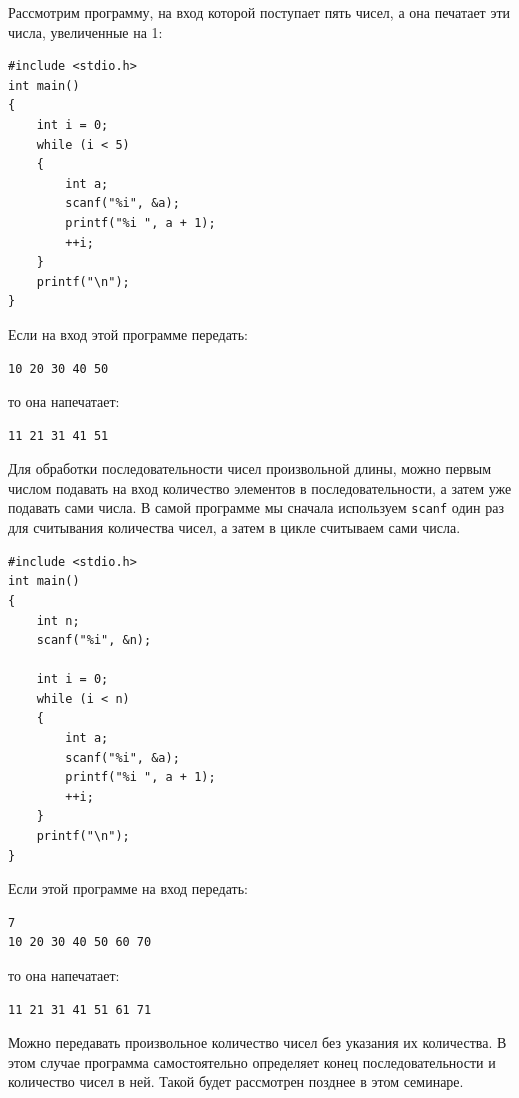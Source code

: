 \documentclass{article}
\begin{document}
Рассмотрим программу, на вход которой поступает пять чисел, а она печатает эти числа, увеличенные на 1:
\begin{lstlisting}
#include <stdio.h>
int main()
{
    int i = 0;
    while (i < 5)
    {
        int a;
        scanf("%i", &a);
        printf("%i ", a + 1);
        ++i;
    }
    printf("\n");
}
\end{lstlisting}
Если на вход этой программе передать:
\begin{verbatim}
10 20 30 40 50
\end{verbatim}
то она напечатает:
\begin{verbatim}
11 21 31 41 51
\end{verbatim}

\noindent Для обработки последовательности чисел произвольной длины, можно первым числом подавать на вход количество элементов в последовательности, а затем уже подавать сами числа. В самой программе мы сначала используем \texttt{scanf} один раз для считывания количества чисел, а затем в цикле считываем сами числа.
\begin{lstlisting}
#include <stdio.h>
int main()
{
    int n;
    scanf("%i", &n);
    
    int i = 0;
    while (i < n)
    {
        int a;
        scanf("%i", &a);
        printf("%i ", a + 1);
        ++i;
    }
    printf("\n");
}
\end{lstlisting}
Если этой программе на вход передать:
\begin{verbatim}
7
10 20 30 40 50 60 70
\end{verbatim}
то она напечатает:
\begin{verbatim}
11 21 31 41 51 61 71
\end{verbatim}

\noindent Можно передавать произвольное количество чисел без указания их количества. В этом случае программа самостоятельно определяет конец последовательности и количество чисел в ней. Такой будет рассмотрен позднее в этом семинаре.
\end{document}
